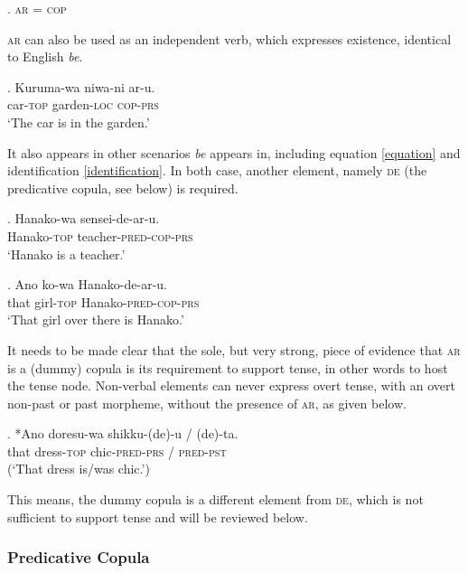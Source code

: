 \documentclass [output=book,colorlinks,citecolor=brown]{langscibook}
\begin{document}
\ex. \textsc{ar} = \textsc{cop}

\textsc{ar} can also be used as an independent verb, which expresses existence, identical to English \textit{be}. %

\exg. Kuruma-wa niwa-ni ar-u.\\
car-\textsc{top} garden-\textsc{loc} \textsc{cop-prs}\\
`The car is in the garden.’

It also appears in other scenarios \textit{be} appears in, including equation \ref{equation} and identification \ref{identification}. In both case, another element, namely \textsc{de} (the predicative copula, see below) is required. %

\exg. Hanako-wa sensei-de-ar-u.\\
Hanako-\textsc{top} teacher-\textsc{pred-cop-prs}\\
`Hanako is a teacher.' \label{equation}

\exg. Ano ko-wa Hanako-de-ar-u.\\
that girl-\textsc{top} Hanako-\textsc{pred-cop-prs}\\
`That girl over there is Hanako.' \label{identification}

It needs to be made clear that the sole, but very strong, piece of evidence that \textsc{ar} is a (dummy) copula is its requirement to support tense, in other words to host the tense node. Non-verbal elements can never express overt tense, with an overt non-past or past morpheme, without the presence of \textsc{ar}, as given below.

\newpage

\exg. *Ano doresu-wa shikku-(de)-u / (de)-ta.\\
that dress-\textsc{top} chic-\textsc{pred-prs} / \textsc{pred-pst}\\
(`That dress is/was chic.’)

This means, the dummy copula is a different element from \textsc{de}, which is not sufficient to support tense and will be reviewed below.

\subsubsection{Predicative Copula} \label{chapter pred}
\end{document}
